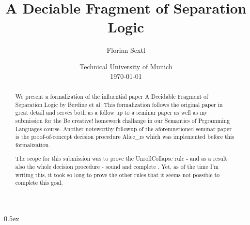\documentclass[11pt,a4paper]{article}
\begin{document}
\title{A Deciable Fragment of Separation Logic}
\author{Florian Sextl}
\date{Technical University of Munich\\[\baselineskip] \today}
\maketitle

\begin{abstract}
  We present a formalization of the influential paper A Decidable Fragment of
  Separation Logic \cite{JoshBerdine.2004} by Berdine et al.
  This formalization follows the original paper in great detail and serves both
  as a follow up to a seminar paper \cite{seminar-paper} as well as my submission
  for the Be creative! homework challange in our Semantics of Prgramming Languages
  course.
  Another noteworthy followup of the aforemnetioned seminar paper is the proof-of-concept
  decision procedure Alice\_rs \cite{Alice-rs} which was implemented before this formalization.

  The scope for this submission was to prove the UnrollCollapse rule - and as a result also the whole
  decision procedure - sound and complete . Yet, as of the time I'm writing this, it took so long to 
  prove the other rules that it seems not possible to complete this goal.
\end{abstract}

\tableofcontents

\pagebreak

\parindent 0pt\parskip 0.5ex



%


\end{document}
